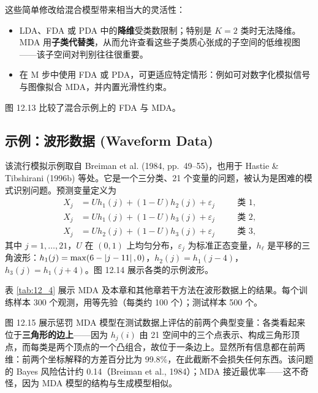 \begin{remark}
这些简单修改给混合模型带来相当大的灵活性：
\begin{itemize}
\item LDA、FDA 或 PDA 中的\textbf{降维}受类数限制；特别是 $K=2$ 类时无法降维。MDA 用\textbf{子类代替类}，从而允许查看这些子类质心张成的子空间的低维视图——该子空间对判别往往很重要。
\item 在 M 步中使用 FDA 或 PDA，可更适应特定情形：例如可对数字化模拟信号与图像拟合 MDA，并内置光滑性约束。
\end{itemize}
图 12.13 比较了混合示例上的 FDA 与 MDA。
\end{remark}

\subsection{示例：波形数据 (Waveform Data)}

\begin{example}[波形数据生成]
该流行模拟示例取自 Breiman et al. (1984, pp.~49--55)，也用于 Hastie \& Tibshirani (1996b) 等处。它是一个三分类、21 个变量的问题，被认为是困难的模式识别问题。预测变量定义为
\begin{equation}
\begin{aligned}
X_j &= U h_1(j) + (1-U)h_2(j) + \varepsilon_j \quad &&\text{类 1},\\
X_j &= U h_1(j) + (1-U)h_3(j) + \varepsilon_j \quad &&\text{类 2},\\
X_j &= U h_2(j) + (1-U)h_3(j) + \varepsilon_j \quad &&\text{类 3},
\end{aligned} \label{eq:12_64}
\end{equation}
其中 $j=1,\dots,21$，$U$ 在 $(0,1)$ 上均匀分布，$\varepsilon_j$ 为标准正态变量，$h_\ell$ 是平移的三角波形：$h_1(j)=\max(6-\left\lvert j-11\right\rvert,0)$，$h_2(j)=h_1(j-4)$，$h_3(j)=h_1(j+4)$。图 12.14 展示各类的示例波形。
\end{example}

\begin{remark}[波形数据的分析与结果]
表 \ref{tab:12_4} 展示 MDA 及本章和其他章若干方法在波形数据上的结果。每个训练样本 300 个观测，用等先验（每类约 100 个）；测试样本 500 个。

图 12.15 展示惩罚 MDA 模型在测试数据上评估的前两个典型变量：各类看起来位于\textbf{三角形的边上}——因为 $h_j(i)$ 由 21 空间中的三个点表示、构成三角形顶点，而每类是两个顶点的一个凸组合，故位于一条边上。显然所有信息都在前两维：前两个坐标解释的方差百分比为 99.8\%，在此截断不会损失任何东西。该问题的 Bayes 风险估计约 0.14（Breiman et al., 1984）；MDA 接近最优率——这不奇怪，因为 MDA 模型的结构与生成模型相似。
\end{remark}

